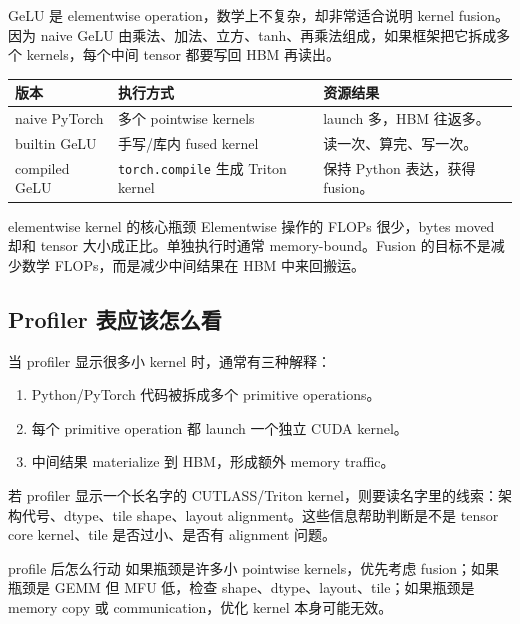 \documentclass[a4paper]{article}
\begin{document}
GeLU 是 elementwise operation，数学上不复杂，却非常适合说明 kernel fusion。因为 naive GeLU 由乘法、加法、立方、tanh、再乘法组成，如果框架把它拆成多个 kernels，每个中间 tensor 都要写回 HBM 再读出。

\begin{longtable}{p{}p{}p{}}
\toprule
\textbf{版本} & \textbf{执行方式} & \textbf{资源结果} \\
\midrule
naive PyTorch & 多个 pointwise kernels & launch 多，HBM 往返多。 \\
builtin GeLU & 手写/库内 fused kernel & 读一次、算完、写一次。 \\
compiled GeLU & \texttt{torch.compile} 生成 Triton kernel & 保持 Python 表达，获得 fusion。 \\
\bottomrule
\end{longtable}

\begin{importantbox}{elementwise kernel 的核心瓶颈}
Elementwise 操作的 FLOPs 很少，bytes moved 却和 tensor 大小成正比。单独执行时通常 memory-bound。Fusion 的目标不是减少数学 FLOPs，而是减少中间结果在 HBM 中来回搬运。
\end{importantbox}

\subsection{Profiler 表应该怎么看}

当 profiler 显示很多小 kernel 时，通常有三种解释：

\begin{enumerate}
    \item Python/PyTorch 代码被拆成多个 primitive operations。
    \item 每个 primitive operation 都 launch 一个独立 CUDA kernel。
    \item 中间结果 materialize 到 HBM，形成额外 memory traffic。
\end{enumerate}

若 profiler 显示一个长名字的 CUTLASS/Triton kernel，则要读名字里的线索：架构代号、dtype、tile shape、layout alignment。这些信息帮助判断是不是 tensor core kernel、tile 是否过小、是否有 alignment 问题。

\begin{knowledgebox}{profile 后怎么行动}
如果瓶颈是许多小 pointwise kernels，优先考虑 fusion；如果瓶颈是 GEMM 但 MFU 低，检查 shape、dtype、layout、tile；如果瓶颈是 memory copy 或 communication，优化 kernel 本身可能无效。
\end{knowledgebox}
\end{document}
